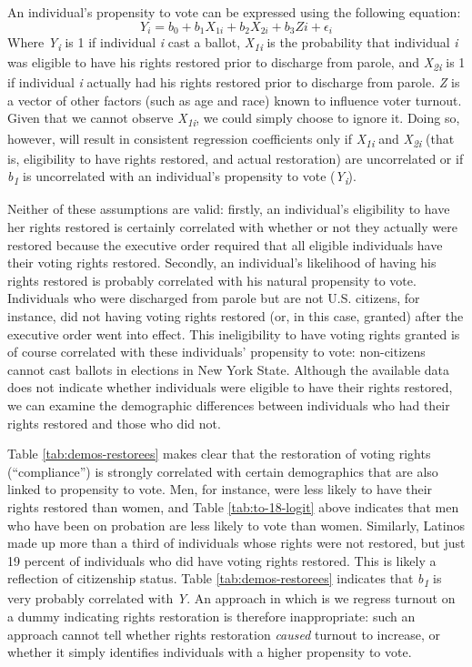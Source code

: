 \documentclass[12pt,]{article}
\begin{document}
An individual's propensity to vote can be expressed using the following equation:
\[ Y_i =  b_0 + b_{1}X_{1i} + b_{2}X_{2i} + b_{3}Z{i}+ \epsilon_{i} \]
Where \emph{Y\textsubscript{i}} is 1 if individual \emph{i} cast a ballot, \emph{X\textsubscript{1i}} is the probability that individual \emph{i} was eligible to have his rights restored prior to discharge from parole, and \emph{X\textsubscript{2i}} is 1 if individual \emph{i} actually had his rights restored prior to discharge from parole. \emph{Z} is a vector of other factors (such as age and race) known to influence voter turnout. Given that we cannot observe \emph{X\textsubscript{1i}}, we could simply choose to ignore it. Doing so, however, will result in consistent regression coefficients only if \emph{X\textsubscript{1i}} and \emph{X\textsubscript{2i}} (that is, eligibility to have rights restored, and actual restoration) are uncorrelated or if \emph{b\textsubscript{1}} is uncorrelated with an individual's propensity to vote (\emph{Y\textsubscript{i}}).

Neither of these assumptions are valid: firstly, an individual's eligibility to have her rights restored is certainly correlated with whether or not they actually were restored because the executive order required that all eligible individuals have their voting rights restored. Secondly, an individual's likelihood of having his rights restored is probably correlated with his natural propensity to vote. Individuals who were discharged from parole but are not U.S. citizens, for instance, did not having voting rights restored (or, in this case, granted) after the executive order went into effect. This ineligibility to have voting rights granted is of course correlated with these individuals' propensity to vote: non-citizens cannot cast ballots in elections in New York State. Although the available data does not indicate whether individuals were eligible to have their rights restored, we can examine the demographic differences between individuals who had their rights restored and those who did not.



Table \ref{tab:demos-restorees} makes clear that the restoration of voting rights (``compliance'') is strongly correlated with certain demographics that are also linked to propensity to vote. Men, for instance, were less likely to have their rights restored than women, and Table \ref{tab:to-18-logit} above indicates that men who have been on probation are less likely to vote than women. Similarly, Latinos made up more than a third of individuals whose rights were not restored, but just 19 percent of individuals who did have voting rights restored. This is likely a reflection of citizenship status. Table \ref{tab:demos-restorees} indicates that \emph{b\textsubscript{1}} is very probably correlated with \emph{Y}. An approach in which is we regress turnout on a dummy indicating rights restoration is therefore inappropriate: such an approach cannot tell whether rights restoration \emph{caused} turnout to increase, or whether it simply identifies individuals with a higher propensity to vote.
\end{document}
